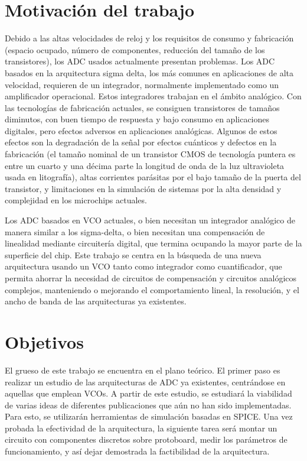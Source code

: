 \documentclass[12pt]{report} %
\begin{document}
	\section{Motivación del trabajo}
	
	Debido a las altas velocidades de reloj y los requisitos de consumo y fabricación (espacio ocupado, número de componentes, reducción del tamaño de los transistores), los ADC usados actualmente presentan problemas. Los ADC basados en la arquitectura sigma delta, los más comunes en aplicaciones de alta velocidad, requieren de un integrador, normalmente implementado como un amplificador operacional. Estos integradores trabajan en el ámbito analógico. Con las tecnologías de fabricación actuales, se consiguen transistores de tamaños diminutos, con buen tiempo de respuesta y bajo consumo en aplicaciones digitales, pero efectos adversos en aplicaciones analógicas. Algunos de estos efectos son la degradación de la señal por efectos cuánticos y defectos en la fabricación (el tamaño nominal de un transistor CMOS de tecnología puntera es entre un cuarto y una décima parte la longitud de onda de la luz ultravioleta usada en litografía), altas corrientes parásitas por el bajo tamaño de la puerta del transistor, y limitaciones en la simulación de sistemas por la alta densidad y complejidad en los microchips actuales.
	
	Los ADC basados en VCO actuales, o bien necesitan un integrador analógico de manera similar a los sigma-delta, o bien necesitan una compensación de linealidad mediante circuitería digital, que termina ocupando la mayor parte de la superficie del chip. Este trabajo se centra en la búsqueda de una nueva arquitectura usando un VCO tanto como integrador como cuantificador, que permita ahorrar la necesidad de circuitos de compensación y circuitos analógicos complejos, manteniendo o mejorando el comportamiento lineal, la resolución, y el ancho de banda de las arquitecturas ya existentes.
	
	\section{Objetivos}
	
	El grueso de este trabajo se encuentra en el plano teórico. El primer paso es realizar un estudio de las arquitecturas de ADC ya existentes, centrándose en aquellas que emplean VCOs. A partir de este estudio, se estudiará la viabilidad de varias ideas de diferentes publicaciones que aún no han sido implementadas. Para esto, se utilizarán herramientas de simulación basadas en SPICE. Una vez probada la efectividad de la arquitectura, la siguiente tarea será montar un circuito con componentes discretos sobre protoboard, medir los parámetros de funcionamiento, y así dejar demostrada la factibilidad de la arquitectura.
\end{document}
